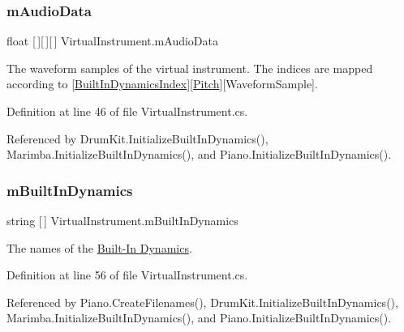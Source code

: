 \subsubsection{\texorpdfstring{m\+Audio\+Data}{mAudioData}}
{\footnotesize\ttfamily float \mbox{[}$\,$\mbox{]}\mbox{[}$\,$\mbox{]}\mbox{[}$\,$\mbox{]} Virtual\+Instrument.\+m\+Audio\+Data\hspace{0.3cm}{\ttfamily [protected]}}



The waveform samples of the virtual instrument. The indices are mapped according to \mbox{[}\hyperlink{group___audio_DefBID}{Built\+In\+Dynamics\+Index}\mbox{]}\mbox{[}\hyperlink{group___music_enums_ga508f69b199ea518f935486c990edac1d}{Pitch}\mbox{]}\mbox{[}Waveform\+Sample\mbox{]}. 



Definition at line 46 of file Virtual\+Instrument.\+cs.



Referenced by Drum\+Kit.\+Initialize\+Built\+In\+Dynamics(), Marimba.\+Initialize\+Built\+In\+Dynamics(), and Piano.\+Initialize\+Built\+In\+Dynamics().

\mbox{\label{group___v_i_base_pro_var_ga87961e72f25fbc2256b614a394aa6f13}} 
\subsubsection{\texorpdfstring{m\+Built\+In\+Dynamics}{mBuiltInDynamics}}
{\footnotesize\ttfamily string \mbox{[}$\,$\mbox{]} Virtual\+Instrument.\+m\+Built\+In\+Dynamics\hspace{0.3cm}{\ttfamily [protected]}}



The names of the \hyperlink{group___audio_DefBID}{Built-\/\+In Dynamics}. 



Definition at line 56 of file Virtual\+Instrument.\+cs.



Referenced by Piano.\+Create\+Filenames(), Drum\+Kit.\+Initialize\+Built\+In\+Dynamics(), Marimba.\+Initialize\+Built\+In\+Dynamics(), and Piano.\+Initialize\+Built\+In\+Dynamics().

\mbox{\label{group___v_i_base_pro_var_gae3db4264dc2a96e99ea680c6d637e6bf}} 
